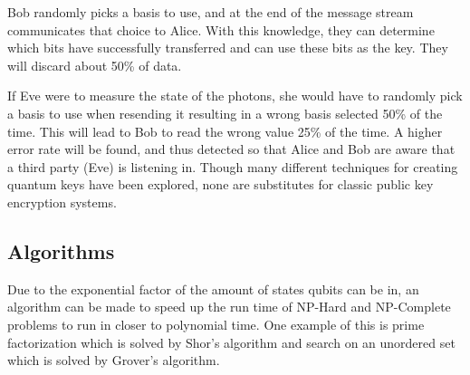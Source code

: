 \documentclass[12pt]{article}
\begin{document}
Bob randomly picks a basis to use, and at the end of the message stream communicates that choice to Alice. With this knowledge, they can determine which bits have successfully transferred and can use these bits as the key. They will discard about 50\% of data.\par
If Eve were to measure the state of the photons, she would have to randomly pick a basis to use when resending it resulting in a wrong basis selected 50\% of the time. This will lead to Bob to read the wrong value 25\% of the time. A higher error rate will be found, and thus detected so that Alice and Bob are aware that a third party (Eve) is listening in.
Though many different techniques for creating quantum keys have been explored, none are substitutes for classic public key encryption systems.
\subsection{Algorithms}
Due to the exponential factor of the amount of states qubits can be in, an algorithm can be made to speed up the run time of NP-Hard and NP-Complete problems to run in closer to polynomial time. One example of this is prime factorization which is solved by Shor's algorithm and search on an unordered set which is solved by Grover's algorithm.
\end{document}
